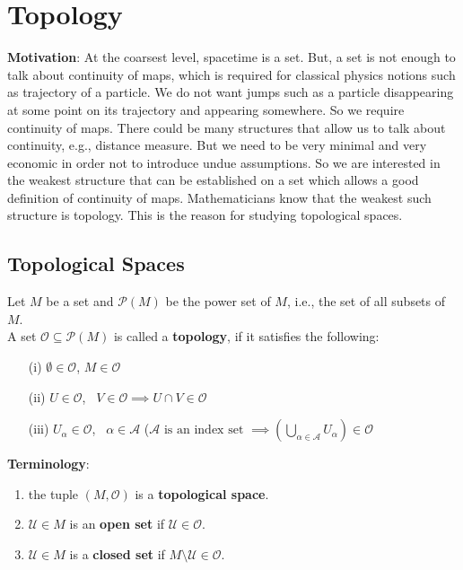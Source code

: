 \section{Topology}
\begin{framed}
\textbf{Motivation}: At the coarsest level, spacetime is a set. But, a set  is not enough to talk about continuity of maps, which is required for classical physics notions such as trajectory of a particle. We do not want jumps such as a particle disappearing at some point on its trajectory and appearing somewhere. So we require continuity of maps. There could be many structures that allow us to talk about continuity, e.g., distance measure. But we need to be very minimal and very economic in order not to introduce undue assumptions. So we are interested in the weakest structure that can be established on a set which allows a good definition of continuity of maps. Mathematicians know that the weakest such structure is topology. This is the reason for studying topological spaces.
\end{framed}

\subsection{Topological Spaces}
\begin{definition}
  Let $M$ be a set and $\mathcal{P}(M)$ be the power set of $M$, i.e., the set of all subsets of $M$.   \\
A set $\mathcal{O} \subseteq \mathcal{P}(M)$ is called a \textbf{topology}, if it satisfies the following:
\begin{enumerate}
  \item[(i)] $\emptyset \in \mathcal{O}$, $M \in \mathcal{O}$ 
\item[(ii)] $U \in \mathcal{O}$, \, $V \in \mathcal{O} \implies U \cap V \in \mathcal{O}$ 
\item[(iii)] $U_{\alpha} \in \mathcal{O}$, \, $\alpha \in \mathcal{A}$ ($\mathcal{A} \text{ is an index set } \implies \left( \bigcup_{\alpha \in \mathcal{A}} U_{\alpha} \right) \in \mathcal{O}$
\end{enumerate}
\end{definition}

\textbf{Terminology}:
\begin{enumerate}
\item the tuple $(M , \mathcal{O})$ is a \textbf{topological space}.
\item $\mathcal{U} \in M$ is an \textbf{open set} if $\mathcal{U} \in \mathcal{O}$.
\item $\mathcal{U} \in M$ is a \textbf{closed set} if $M \setminus \mathcal{U} \in \mathcal{O}$.
\end{enumerate}

